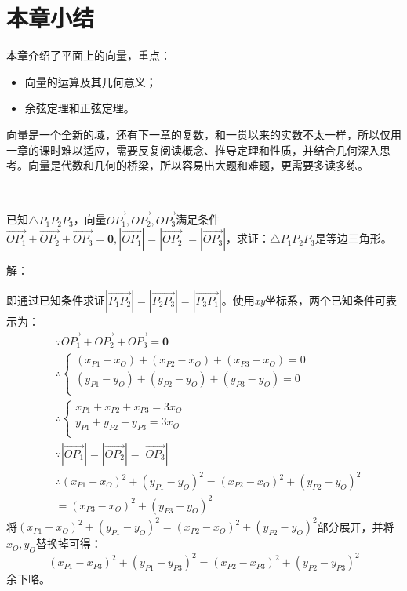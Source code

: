 \section{本章小结}

本章介绍了平面上的向量，重点：
\begin{itemize}
    \item 向量的运算及其几何意义；
    \item 余弦定理和正弦定理。
\end{itemize}

向量是一个全新的域，还有下一章的复数，和一贯以来的实数不太一样，所以仅用一章的课时难以适应，需要反复阅读概念、推导定理和性质，并结合几何深入思考。向量是代数和几何的桥梁，所以容易出大题和难题，更需要多读多练。

~

\begin{example}
已知$\bigtriangleup P_1P_2P_3$，向量$\overrightarrow{OP_1},\overrightarrow{OP_2},\overrightarrow{OP_3}$满足条件$\overrightarrow{OP_1}+\overrightarrow{OP_2}+\overrightarrow{OP_3}=\mathbf{0},\left| \overrightarrow{OP_1} \right|=\left| \overrightarrow{OP_2} \right|=\left| \overrightarrow{OP_3} \right|$，求证：$\bigtriangleup P_1P_2P_3$是等边三角形。
\end{example}

解：

即通过已知条件求证$\left| \overrightarrow{P_1P_2} \right|=\left| \overrightarrow{P_2P_3} \right|=\left| \overrightarrow{P_3P_1} \right|$。使用{\it xy}坐标系，两个已知条件可表示为：
\begin{align*}
&\because \overrightarrow{OP_1}+\overrightarrow{OP_2}+\overrightarrow{OP_3}=\mathbf{0} \\
&\therefore \begin{cases}
	\left( x_{P1}-x_O \right) +\left( x_{P2}-x_O \right) +\left( x_{P3}-x_O \right) =0\\
	\left( y_{P1}-y_O \right) +\left( y_{P2}-y_O \right) +\left( y_{P3}-y_O \right) =0\\
\end{cases} \\
&\therefore \begin{cases}
	x_{P1}+x_{P2}+x_{P3}=3x_O\\
	y_{P1}+y_{P2}+y_{P3}=3x_O\\
\end{cases} \\
&\because \left| \overrightarrow{OP_1} \right|=\left| \overrightarrow{OP_2} \right|=\left| \overrightarrow{OP_3} \right| \\
&\therefore \left( x_{P1}-x_O \right) ^2+\left( y_{P1}-y_O \right) ^2=\left( x_{P2}-x_O \right) ^2+\left( y_{P2}-y_O \right) ^2 \\
&=\left( x_{P3}-x_O \right) ^2+\left( y_{P3}-y_O \right) ^2
\end{align*}
将$\left( x_{P1}-x_O \right) ^2+\left( y_{P1}-y_O \right) ^2=\left( x_{P2}-x_O \right) ^2+\left( y_{P2}-y_O \right) ^2$部分展开，并将$x_O,y_O$替换掉可得：
\[
\left( x_{P1}-x_{P3} \right) ^2+\left( y_{P1}-y_{P3} \right) ^2=\left( x_{P2}-x_{P3} \right) ^2+\left( y_{P2}-y_{P3} \right) ^2
\]
余下略。

